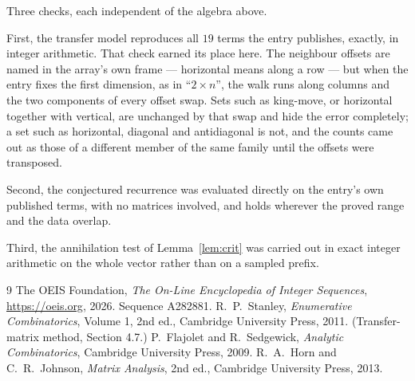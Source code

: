 \documentclass[11pt,a4paper]{article}
\theoremstyle{plain}
\theoremstyle{definition}
\begin{document}
Three checks, each independent of the algebra above.

First, the transfer model reproduces all $19$ terms the entry publishes, exactly, in
integer arithmetic. That check earned its place here. The neighbour offsets are named in the
array's own frame --- horizontal means along a row --- but when the entry fixes the first
dimension, as in ``$2\times n$'', the walk runs along columns and the two components of every
offset swap. Sets such as king-move, or horizontal together with vertical, are unchanged by
that swap and hide the error completely; a set such as horizontal, diagonal and antidiagonal
is not, and the counts came out as those of a different member of the same family until the
offsets were transposed.

Second, the conjectured recurrence was evaluated directly on the entry's own published terms,
with no matrices involved, and holds wherever the proved range and the data overlap.

Third, the annihilation test of Lemma~\ref{lem:crit} was carried out in exact integer
arithmetic on the whole vector rather than on a sampled prefix.

\begin{thebibliography}{9}
 The OEIS Foundation, \emph{The On-Line Encyclopedia of Integer
Sequences}, \url{https://oeis.org}, 2026. Sequence A282881.
 R.~P.~Stanley, \emph{Enumerative Combinatorics}, Volume 1, 2nd ed.,
Cambridge University Press, 2011. (Transfer-matrix method, Section 4.7.)
 P.~Flajolet and R.~Sedgewick, \emph{Analytic Combinatorics}, Cambridge
University Press, 2009.
 R.~A.~Horn and C.~R.~Johnson, \emph{Matrix Analysis}, 2nd ed., Cambridge
University Press, 2013.
\end{thebibliography}
\end{document}
